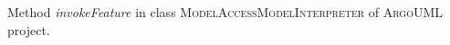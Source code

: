 %
%
%

Method \textit{invokeFeature} in class \textsc{ModelAccessModelInterpreter} of \textsc{ArgoUML} project.

